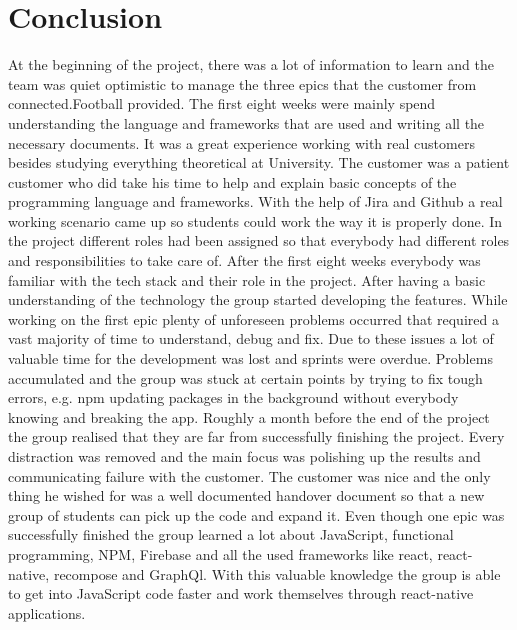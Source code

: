 \section{Conclusion}
\label{sec:Conclusion}

At the beginning of the project, there was a lot of information to learn and the team was quiet optimistic to manage the three epics that the customer from connected.Football provided. The first eight weeks were mainly spend understanding the language and frameworks that are used and writing all the necessary documents. It was a great experience working with real customers besides studying everything theoretical at University. The customer was a patient customer who did take his time to help and explain basic concepts of the programming language and frameworks. With the help of Jira and Github a real working scenario came up so students could work the way it is properly done. In the project different roles had been assigned so that everybody had different roles and responsibilities to take care of. After the first eight weeks everybody was familiar with the tech stack and their role in the project.
\newline
After having a basic understanding of the technology the group started developing the features. While working on the first epic plenty of unforeseen problems occurred that required a vast majority of time to understand, debug and fix. Due to these issues a lot of valuable time for the development was lost and sprints were overdue. Problems accumulated and the group was stuck at certain points by trying to fix tough errors, e.g. npm updating packages in the background without everybody knowing and breaking the app.
\newline
Roughly a month before the end of the project the group realised that they are far from successfully finishing the project. Every distraction was removed and the main focus was polishing up the results and communicating failure with the customer. The customer was nice and the only thing he wished for was a well documented handover document so that a new group of students can pick up the code and expand it.
\newline
Even though one epic was successfully finished the group learned a lot about JavaScript, functional programming, NPM, Firebase and all the used frameworks like react, react-native, recompose and GraphQl. With this valuable knowledge the group is able to get into JavaScript code faster and work themselves through react-native applications.